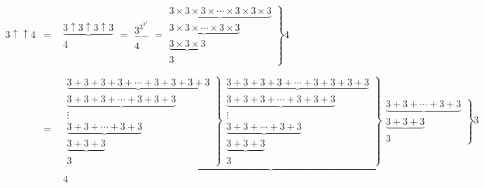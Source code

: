 \documentclass[a4j,fleqn,10pt]{jarticle}
\begin{document}
\begin{eqnarray}
3 \uparrow \uparrow 4&=&
\left .
\begin{array} {c}
\underbrace {
3 \uparrow 3 \uparrow 3 \uparrow 3
}\\
4
\end{array}
\right . 
=
\left .
\begin{array} {c}
\underbrace {
3^{3^{3^3}}
}\\
4
\end{array}
\right . 
%
=
\left . 
\begin{array} {c}
\underbrace {3 \times 3 \times 3 \times \dotsb \times 3 \times 3 \times 3 } \\
\underbrace {3 \times 3 \times \dotsb \times 3 \times 3 } \\
\underbrace {3 \times 3 \times 3 } \\
3
\end{array}
\right \} 4
\\
\nonumber \\
%
&=&
\left .
\begin{array} {c}
\underbrace {
\left .
\begin{array} {c}
\underbrace {3+3+3+3+ \dotsb +3+3+3+3}
\\
\underbrace {3+3+3+ \dotsb +3+3+3}\\
\vdots \\
\underbrace {3+3+ \dotsb +3+3}\\
\underbrace {3+3+3} \\
3
\end{array}
\right \}
\left .
\begin{array} {c}
\underbrace {3+3+3+3+ \dotsb +3+3+3+3}
\\
\underbrace {3+3+3+ \dotsb +3+3+3}\\
\vdots \\
\underbrace {3+3+ \dotsb +3+3}\\
\underbrace {3+3+3} \\
3
\end{array}
\right \}
\left .
\begin{array} {c}
\underbrace {3+3+ \dotsb +3+3}
\\
\underbrace {3+3+3}\\
3
\end{array}
\right \} 
3
} \\
4
\end{array}
\right .
\end{eqnarray}
\end{document}
